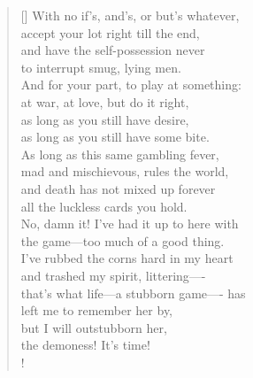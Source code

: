 \documentclass[]{article}
\begin{document}
\vspace*{0.005\textheight}
\settowidth{\versewidth}{With no if's, and's, and but's whatever }
\begin{verse}[\versewidth]
With no if's, and's, or but's whatever,\\
accept your lot right till the end,\\
and have the self-possession never\\
to interrupt smug, lying men.\\
And for your part, to play at something:\\
at war, at love, but do it right,\\
as long as you still have desire,\\
as long as you still have some bite.\\
As long as this same gambling fever,\\
mad and mischievous, rules the world,\\
and death has not mixed up forever\\
all the luckless cards you hold.\\
No, damn it! I've had it up to here with\\
the game—too much of a good thing.\\
I've rubbed the corns hard in my heart\\
and trashed my spirit, littering—- \\
that's what life—a stubborn game—- has\\
left me to remember her by,\\
but I will outstubborn her,\\
the demoness! It's time!\\!
\end{verse}
\bigskip \bigskip \bigskip
\end{document}
